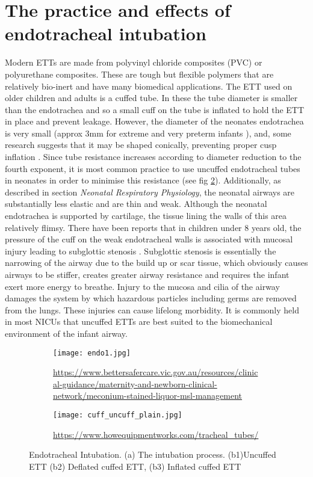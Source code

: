 \documentclass[12pt, openany, oneside]{book}
\begin{document}
\section{The practice and effects of endotracheal intubation}
Modern ETTs are made from polyvinyl chloride composites (PVC) or polyurethane composites. These are tough but flexible polymers that are relatively bio-inert and have many biomedical applications. The ETT used on older children and adults is a cuffed tube. In these the tube diameter is smaller than the endotrachea and so a small cuff on the tube is inflated to hold the ETT in place and prevent leakage. However, the diameter of the neonates endotrachea is very small (approx 3mm for extreme and very preterm infants \citep{ett}), and, some research suggests that it may be shaped conically, preventing proper cusp inflation \citep{strong1977endotracheal}. Since tube resistance increases according to diameter reduction to the fourth exponent, it is most common practice to use uncuffed endotracheal tubes in neonates in order to minimise this resistance (see fig \ref{fig:endo2}). Additionally, as described in section \textit{Neonatal Respiratory Physiology}, the neonatal airways are substantially less elastic and are thin and weak. Although the neonatal endotrachea is supported by cartilage, the tissue lining the walls of this area relatively flimsy. There have been reports that in children under 8 years old, the pressure of the cuff on the weak endotracheal walls is associated with mucosal injury leading to subglottic stenosis \citep{thomas2016cuffed}. Subglottic stenosis is essentially the narrowing of the airway due to the build up or scar tissue, which obviously causes airways to be stiffer, creates greater airway resistance and requires the infant exert more energy to breathe. Injury to the mucosa and cilia of the airway damages the system by which hazardous particles including germs are removed from the lungs. These injuries can cause lifelong morbidity. It is commonly held in most NICUs that uncuffed ETTs are best suited to the biomechanical environment of the infant airway.\\

\begin{figure}
\centering
	\begin{subfigure}{0.4\textwidth}
		\texttt{[image: endo1.jpg]}
		\caption{\tiny{\url{https://www.bettersafercare.vic.gov.au/resources/clinical-guidance/maternity-and-newborn-clinical-network/meconium-stained-liquor-msl-management}}}
		\label{fig:endo1}
		
	\end{subfigure}%
	\hfill
	\begin{subfigure}{0.5\textwidth}
		\texttt{[image: cuff\_uncuff\_plain.jpg]}
		\caption{{\tiny\url{https://www.howequipmentworks.com/tracheal_tubes/}}}
		\label{fig:endo2}
	\end{subfigure}
	
	\caption[Endotracheal Intubation]{Endotracheal Intubation. (a) The intubation process. (b1)Uncuffed ETT (b2) Deflated cuffed ETT, (b3) Inflated cuffed ETT}
	\label{fig:endo}
\end{figure}
\end{document}
